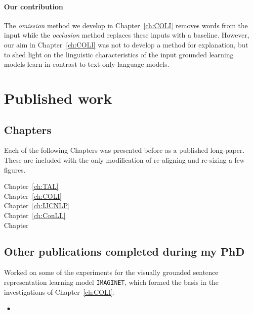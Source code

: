 \paragraph{Our contribution}
The \emph{omission} method we develop in Chapter~\ref{ch:COLI} removes words
from the input while the \emph{occlusion} \citep{li2016understanding}
method replaces these inputs with a baseline.
However, our aim in Chapter~\ref{ch:COLI} was not to develop a method for explanation, but to
shed light on the linguistic characteristics of the input grounded learning
models learn in contrast to text-only language models.

\section{Published work}

\subsection{Chapters}

Each of the following Chapters was presented before as a published long-paper. These are included with
the only modification of re-aligning and re-sizing a few figures.

\begin{description}
	\item[Chapter~\ref{ch:TAL}] 
	\item[Chapter~\ref{ch:COLI}] 
	\item[Chapter~\ref{ch:IJCNLP}] 
	\item[Chapter~\ref{ch:ConLL}] 
	\item[Chapter ] 
\end{description}

\subsection{Other publications completed during my PhD}

Worked on some of the experiments for the visually grounded sentence representation learning
model \texttt{IMAGINET}, which formed the basis in the investigations of Chapter~\ref{ch:COLI}:

\begin{itemize}
\item {}
\end{itemize}

